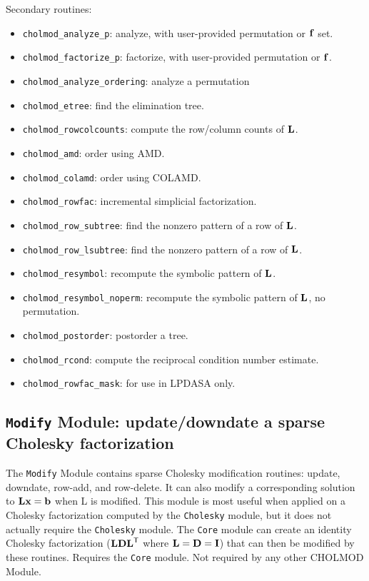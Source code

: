 \documentclass[11pt]{article}
\newcommand{\m}[1]{{\bf{#1}}}       %
\newcommand{\tr}{^{\sf T}}          %
\begin{document}
\noindent Secondary routines:
    \begin{itemize}
    \item {\tt cholmod\_analyze\_p}: analyze, with user-provided permutation or $\m{f}$ set.
    \item {\tt cholmod\_factorize\_p}: factorize, with user-provided permutation or $\m{f}$.
    \item {\tt cholmod\_analyze\_ordering}:  analyze a permutation
    \item {\tt cholmod\_etree}: find the elimination tree.
    \item {\tt cholmod\_rowcolcounts}: compute the row/column counts of $\m{L}$.
    \item {\tt cholmod\_amd}: order using AMD.
    \item {\tt cholmod\_colamd}: order using COLAMD.
    \item {\tt cholmod\_rowfac}: incremental simplicial factorization.
    \item {\tt cholmod\_row\_subtree}: find the nonzero pattern of a row of $\m{L}$.
    \item {\tt cholmod\_row\_lsubtree}: find the nonzero pattern of a row of $\m{L}$.
    \item {\tt cholmod\_resymbol}: recompute the symbolic pattern of $\m{L}$.
    \item {\tt cholmod\_resymbol\_noperm}: recompute the symbolic pattern of $\m{L}$, no permutation.
    \item {\tt cholmod\_postorder}: postorder a tree.
    \item {\tt cholmod\_rcond}: compute the reciprocal condition number estimate.
    \item {\tt cholmod\_rowfac\_mask}: for use in LPDASA only.
    \end{itemize}

\newpage \subsection{{\tt Modify} Module: update/downdate a sparse Cholesky factorization}

The {\tt Modify} Module contains sparse Cholesky modification routines:
update, downdate, row-add, and row-delete.
It can also modify a corresponding solution to $\m{Lx}=\m{b}$ when L is modified.
This module is most useful when applied on a Cholesky factorization computed by
the {\tt Cholesky} module, but it does not actually require the {\tt Cholesky} module.
The {\tt Core} module can create an identity Cholesky factorization ($\m{LDL}\tr$ where
$\m{L}=\m{D}=\m{I}$) that can then be modified by these routines.
Requires the {\tt Core} module.  Not required by any other CHOLMOD Module.
\end{document}
